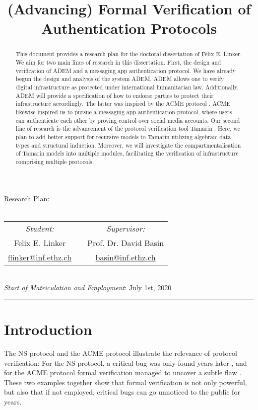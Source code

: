\documentclass{article}
\title{(Advancing) Formal Verification of Authentication Protocols}
\makeatletter
\newcommand{\email}[1]{\href{mailto://#1}{\ttfamily #1}}
\renewcommand\maketitle{{
  \raggedright
  {\sffamily \large Research Plan:}\\[2ex]
  {\sffamily \LARGE \@title}\\[4ex]
  \begin{center}
    \begin{tabular}{c c c}
      {\itshape Student:} & \hspace{1cm} & {\itshape Supervisor:} \\
      {Felix E. Linker} && {Prof. Dr. David Basin} \\
      {\email{flinker@inf.ethz.ch}} && {\email{basin@inf.ethz.ch}}
    \end{tabular}\\[4ex]
    {\itshape Start of Matriculation and Employment}: July 1st, 2020
  \end{center}
  \par\noindent\rule{\textwidth}{0.4pt}
}}
\makeatother
\begin{document}
\maketitle

\begin{abstract}
  This document provides a research plan for the doctoral dissertation of Felix E. Linker.
  We aim for two main lines of research in this dissertation.
  First, the design and verification of \gls{ADEM} \cite{BlogADEM} and a messaging app authentication protocol.
  We have already begun the design and analysis of the system \gls{ADEM}.
  \Gls{ADEM} allows one to verify digital infrastructure as protected under international humanitarian law.
  Additionally, \gls{ADEM} will provide a specification of how to endorse parties to protect their infrastructure accordingly.
  The latter was inspired by the \gls{ACME} protocol \cite{ACMERFC}.
  \Gls{ACME} likewise inspired us to pursue a messaging app authentication protocol, where users can authenticate each other by proving control over social media accounts.
  Our second line of research is the advancement of the protocol verification tool Tamarin \cite{tamarin}.
  Here, we plan to add better support for recursive models to Tamarin utilizing algebraic data types and structural induction.
  Moreover, we will investigate the compartmentalisation of Tamarin models into multiple modules, facilitating the verification of infrastructure comprising multiple protocols.
\end{abstract}

\section{Introduction}

The \gls{NS} protocol \cite{NeedhamSchroeder} and the \gls{ACME} protocol \cite{ACMERFC} illustrate the relevance of protocol verification:
For the \gls{NS} protocol, a critical bug was only found years later \cite{NeedhamSchroederAttack}, and for the \gls{ACME} protocol formal verification managed to uncover a subtle flaw \cite{SeemsLegit}.
These two examples together show that formal verification is not only powerful, but also that if not employed, critical bugs can go unnoticed to the public for years.
\end{document}
